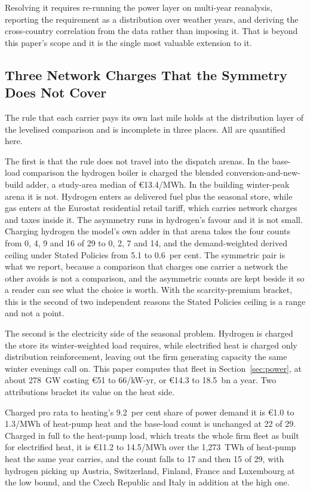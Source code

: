 Resolving it requires re-running the power layer on multi-year reanalysis, reporting the
requirement as a distribution over weather years, and deriving the cross-country
correlation from the data rather than imposing it. That is beyond this paper's scope and it
is the single most valuable extension to it.

\subsection{Three Network Charges That the Symmetry Does Not Cover}
The rule that each carrier pays its own last mile holds at the distribution layer of the
levelised comparison and is incomplete in three places. All are quantified here.

The first is that the rule does not travel into the dispatch arenas. In the base-load
comparison the hydrogen boiler is charged the blended conversion-and-new-build adder, a
study-area median of \euro{}13.4/MWh. In the building winter-peak arena it is not.
Hydrogen enters as delivered fuel plus the seasonal store, while gas enters at the
Eurostat residential retail tariff, which carries network charges and taxes inside it.
The asymmetry runs in hydrogen's favour and it is not small. Charging hydrogen the
model's own adder in that arena takes the four counts from 0, 4, 9 and 16 of 29 to 0, 2,
7 and 14, and the demand-weighted derived ceiling under Stated Policies from 5.1 to
0.6~per cent. The symmetric pair is what we report, because a comparison that charges
one carrier a network the other avoids is not a comparison, and the asymmetric counts are
kept beside it so a reader can see what the choice is worth. With the scarcity-premium bracket, this is the second of two independent reasons
the Stated Policies ceiling is a range and not a point.

The second is the electricity side of the seasonal problem. Hydrogen is charged the store
its winter-weighted load requires, while electrified heat is charged only distribution
reinforcement, leaving out the firm generating capacity the same winter evenings call
on. This paper computes that fleet in Section~\ref{sec:power}, at about 278~GW costing
\euro{}51 to 66/kW-yr, or \euro{}14.3 to 18.5~bn a year. Two attributions bracket its
value on the heat side.

Charged pro rata to heating's 9.2~per cent share of power demand it is \euro{}1.0 to
1.3/MWh of heat-pump heat and the base-load count is unchanged at 22 of 29. Charged in
full to the heat-pump load, which treats the whole firm fleet as built for electrified
heat, it is \euro{}11.2 to 14.5/MWh over the 1{,}273~TWh of heat-pump heat the same year
carries, and the count falls to 17 and then 15 of 29, with hydrogen picking up Austria,
Switzerland, Finland, France and Luxembourg at the low bound, and the Czech Republic and
Italy in addition at the high one.

